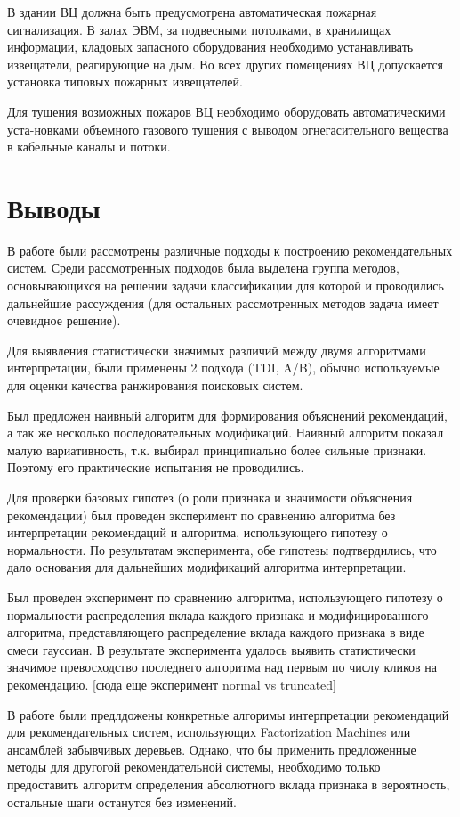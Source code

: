 \documentclass[12pt,a4paper]{report}
\begin{document}
В здании ВЦ должна быть предусмотрена автоматическая пожарная сигнализация. В залах ЭВМ, за подвесными потолками, в хранилищах информации, кладовых запасного оборудования необходимо устанавливать извещатели, реагирующие на дым. Во всех других помещениях ВЦ допускается установка типовых пожарных извещателей.

Для тушения возможных пожаров ВЦ необходимо оборудовать автоматическими уста-новками объемного газового тушения с выводом огнегасительного вещества в кабельные каналы и потоки.

\chapter{Выводы}
В работе были рассмотрены различные подходы к построению рекомендательных систем. Среди рассмотренных подходов была выделена группа методов, основывающихся на решении задачи классификации для которой и проводились дальнейшие рассуждения (для остальных рассмотренных методов задача имеет очевидное решение). 

Для выявления статистически значимых различий между двумя алгоритмами интерпретации, были применены 2 подхода (TDI, A/B), обычно используемые для оценки качества ранжирования поисковых систем.

Был предложен наивный алгоритм для формирования объяснений рекомендаций, а так же несколько последовательных модификаций. Наивный алгоритм показал малую вариативность, т.к. выбирал принципиально более сильные признаки. Поэтому его практические испытания не проводились.

Для проверки базовых гипотез (о роли признака и значимости объяснения рекомендации) был проведен эксперимент по сравнению алгоритма без интерпретации рекомендаций и алгоритма, использующего гипотезу о нормальности. По результатам эксперимента, обе гипотезы подтвердились, что дало основания для дальнейших модификаций алгоритма интерпретации.

Был проведен эксперимент по сравнению алгоритма, использующего гипотезу о нормальности распределения вклада каждого признака и модифицированного алгоритма, представляющего распределение вклада каждого признака в виде смеси гауссиан. В результате эксперимента удалось выявить статистически значимое превосходство последнего алгоритма над первым по числу кликов на рекомендацию. 
[сюда еще эксперимент normal vs truncated]

В работе были предлдожены конкретные алгоримы интерпретации рекомендаций для рекомендательных систем, использующих Factorization Machines или ансамблей забывчивых деревьев. Однако, что бы применить предложенные методы для другогой рекомендательной системы, необходимо только предоставить алгоритм определения абсолютного вклада признака в вероятность, остальные шаги останутся без изменений.
\end{document}
